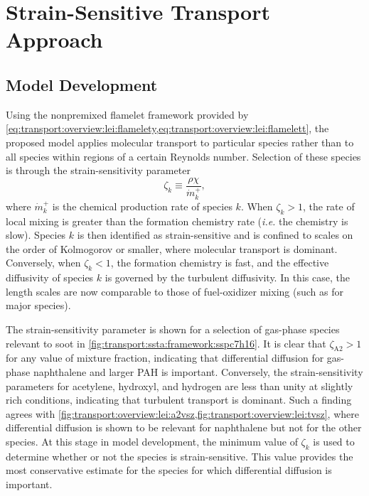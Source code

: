 \section{Strain-Sensitive Transport Approach}
\label{sec:transport:ssta}

\subsection{Model Development}
\label{sec:transport:ssta:framework}

Using the nonpremixed flamelet framework provided by \cref{eq:transport:overview:lei:flamelety,eq:transport:overview:lei:flamelett}, the proposed model applies molecular transport to particular species rather than to all species within regions of a certain Reynolds number. Selection of these species is through the strain-sensitivity parameter
\begin{equation}\label{eq:transport:ssta:framework:ssp}
  \zeta_k \equiv \frac{\rho\chi}{\dot{m}_k^{+}},
\end{equation}
where $\dot{m}_k^{+}$ is the chemical production rate of species $k$. When $\zeta_k > 1$, the rate of local mixing is greater than the formation chemistry rate (\textit{i.e.} the chemistry is slow). Species $k$ is then identified as strain-sensitive and is confined to scales on the order of Kolmogorov or smaller, where molecular transport is dominant. Conversely, when $\zeta_k < 1$, the formation chemistry is fast, and the effective diffusivity of species $k$ is governed by the turbulent diffusivity. In this case, the length scales are now comparable to those of fuel-oxidizer mixing (such as for major species).

The strain-sensitivity parameter is shown for a selection of gas-phase species relevant to soot in \cref{fig:transport:ssta:framework:sspc7h16}. It is clear that $\zeta_{\text{A2}} > 1$ for any value of mixture fraction, indicating that differential diffusion for gas-phase naphthalene and larger PAH is important. Conversely, the strain-sensitivity parameters for acetylene, hydroxyl, and hydrogen are less than unity at slightly rich conditions, indicating that turbulent transport is dominant. Such a finding agrees with \cref{fig:transport:overview:lei:a2vsz,fig:transport:overview:lei:tvsz}, where differential diffusion is shown to be relevant for naphthalene but not for the other species. At this stage in model development, the minimum value of $\zeta_k$ is used to determine whether or not the species is strain-sensitive. This value provides the most conservative estimate for the species for which differential diffusion is important.

